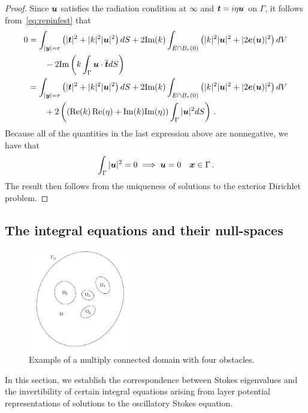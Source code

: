 \begin{proof}
Since ${\boldsymbol u}$ satisfies the radiation condition at $\infty$ and ${\boldsymbol t} = i\eta {\boldsymbol u}$
on $\Gamma$, it follows from~\cref{eq:repinfest} that
\begin{align*}
0 &=
\int_{|{\boldsymbol y}|=r} \left( |{\boldsymbol t}|^2 + |k|^2 |{\boldsymbol u}|^2 \right) dS +
2 \text{Im}(k) \int_{E \cap B_{r}(0)} \left(|k|^2 |{\boldsymbol u}|^2 + |2{\boldsymbol e}({\boldsymbol u})|^2 \right)
dV \nonumber \\
& \qquad - 2 \text{Im} \left( k \int_{\Gamma} {\boldsymbol u} \cdot \overline{{\boldsymbol t}} dS  \right) \\
&= 
\int_{|{\boldsymbol y}|=r} \left( |{\boldsymbol t}|^2 + |k|^2 |{\boldsymbol u}|^2 \right) dS +
2 \text{Im}(k) \int_{E \cap B_{r}(0)} \left(|k|^2 |{\boldsymbol u}|^2 + |2{\boldsymbol e}({\boldsymbol u})|^2 \right)
dV \nonumber \\
& \qquad + 2 \left( \left (\operatorname{Re}(k)\operatorname{Re}(\eta) + {\textrm{\textup{Im}}}(k){\textrm{\textup{Im}}}(\eta)
\right ) \int_{\Gamma} |{\boldsymbol u}|^{2} dS  \right)
\, .
\end{align*}
Because all of the quantities in the last expression above are
nonnegative, we have that
\begin{equation}
  \int_{\Gamma} |{\boldsymbol u}|^{2} = 0 \implies {\boldsymbol u} = 0  \quad {\boldsymbol x} \in \Gamma \, .
  \nonumber
\end{equation}
The result then follows from the uniqueness of solutions to the exterior
Dirichlet problem.
\end{proof}

\subsection{The integral equations and their null-spaces}

\begin{figure}
\begin{center}
\includegraphics[width=0.4\textwidth]{media/mc_dom}
\end{center}
\caption{Example of a multiply connected domain with four obstacles.}
\label{fig:mc_dom}
\end{figure}

In this section, we establish the correspondence between
Stokes eigenvalues and the invertibility of certain integral
equations arising from layer potential representations
of solutions to the oscillatory Stokes equation.

